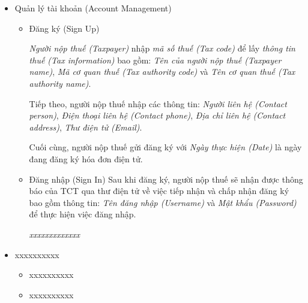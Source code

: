 \begin{itemize}

\item Quản lý tài khoản (Account Management)

\begin{itemize}

\item Đăng ký (Sign Up)

\emph{Người nộp thuế (Taxpayer)} nhập \emph{mã số thuế (Tax code)} để lấy \emph{thông tin thuế (Tax information)} bao gồm: \emph{Tên của người nộp thuế (Taxpayer name)}, \emph{Mã cơ quan thuế (Tax authority code)} và \emph{Tên cơ quan thuế (Tax authority name)}.

Tiếp theo, người nộp thuế nhập các thông tin: \emph{Người liên hệ (Contact person)}, \emph{Điện thoại liên hệ (Contact phone)}, \emph{Địa chỉ liên hệ (Contact address)}, \emph{Thư điện tử (Email)}.

Cuối cùng, người nộp thuế gửi đăng ký với \emph{Ngày thực hiện (Date)} là ngày đang đăng ký hóa đơn điện tử.

\item Đăng nhập (Sign In)
Sau khi   đăng ký,  người nộp thuế   sẽ nhận được thông báo  của TCT  qua   thư điện tử về việc tiếp nhận và chấp nhận đăng ký   bao gồm thông tin:  \emph{Tên đăng nhập (Username)}      và  \emph{Mật khẩu (Password)}       để thực hiện việc đăng nhập.



\emph{xxxxxxxxxxxxx}


\end{itemize}

\item xxxxxxxxxx

\begin{itemize}

\item xxxxxxxxxx

\item xxxxxxxxxx

\end{itemize}

\end{itemize}






